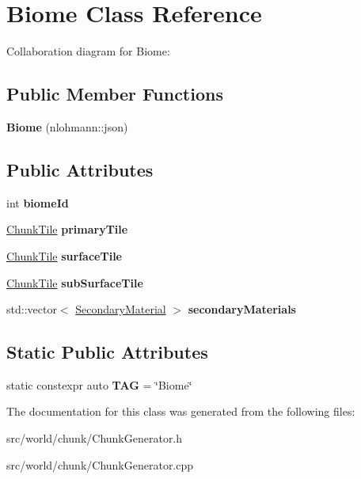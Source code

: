 \hypertarget{classBiome}{\section{Biome Class Reference}
\label{classBiome}
}


Collaboration diagram for Biome\-:
\subsection*{Public Member Functions}
\begin{DoxyCompactItemize}
\item 
\hypertarget{classBiome_a407c0e4263eee9af08e90caf1a7b4184}{{\bfseries Biome} (nlohmann\-::json)}\label{classBiome_a407c0e4263eee9af08e90caf1a7b4184}

\end{DoxyCompactItemize}
\subsection*{Public Attributes}
\begin{DoxyCompactItemize}
\item 
\hypertarget{classBiome_a18a3a187676e49e4250a82871bef722f}{int {\bfseries biome\-Id}}\label{classBiome_a18a3a187676e49e4250a82871bef722f}

\item 
\hypertarget{classBiome_a18ad1a11ef83d49b1fbcf925bba29ff5}{\hyperlink{classChunkTile}{Chunk\-Tile} {\bfseries primary\-Tile}}\label{classBiome_a18ad1a11ef83d49b1fbcf925bba29ff5}

\item 
\hypertarget{classBiome_abd58396ce06a2255cf349d08d4ebc4d4}{\hyperlink{classChunkTile}{Chunk\-Tile} {\bfseries surface\-Tile}}\label{classBiome_abd58396ce06a2255cf349d08d4ebc4d4}

\item 
\hypertarget{classBiome_a85cc0f9115bc58dd3d55a8097f832ab8}{\hyperlink{classChunkTile}{Chunk\-Tile} {\bfseries sub\-Surface\-Tile}}\label{classBiome_a85cc0f9115bc58dd3d55a8097f832ab8}

\item 
\hypertarget{classBiome_ac2a44a25fddf50a56602da4553574c52}{std\-::vector$<$ \hyperlink{classSecondaryMaterial}{Secondary\-Material} $>$ {\bfseries secondary\-Materials}}\label{classBiome_ac2a44a25fddf50a56602da4553574c52}

\end{DoxyCompactItemize}
\subsection*{Static Public Attributes}
\begin{DoxyCompactItemize}
\item 
\hypertarget{classBiome_a5358d2284ad8408116e8201c2bf39ac6}{static constexpr auto {\bfseries T\-A\-G} = \char`\"{}Biome\char`\"{}}\label{classBiome_a5358d2284ad8408116e8201c2bf39ac6}

\end{DoxyCompactItemize}


The documentation for this class was generated from the following files\-:\begin{DoxyCompactItemize}
\item 
src/world/chunk/Chunk\-Generator.\-h\item 
src/world/chunk/Chunk\-Generator.\-cpp\end{DoxyCompactItemize}
